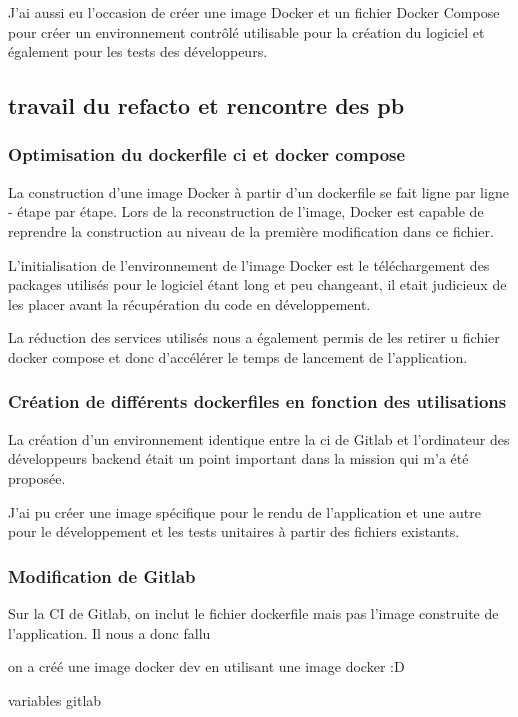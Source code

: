 J'ai aussi eu l'occasion de créer une image Docker et un fichier Docker Compose pour créer un environnement contrôlé utilisable pour la création du logiciel et également pour les tests des développeurs.

\subsection{travail du refacto et rencontre des pb}
\subsubsection{Optimisation du dockerfile ci et docker compose}
La construction d'une image Docker à partir d'un dockerfile se fait ligne par ligne - étape par étape.
Lors de la reconstruction de l'image, Docker est capable de reprendre la construction au niveau de la première modification dans ce fichier.

L'initialisation de l'environnement de l'image Docker est le téléchargement des packages utilisés pour le logiciel étant long et peu changeant, il etait judicieux de les placer avant la récupération du code en développement.

La réduction des services utilisés nous a également permis de les retirer u fichier docker compose et donc d'accélérer le temps de lancement de l'application.

\subsubsection{Création de différents dockerfiles en fonction des utilisations}
La création d'un environnement identique entre la ci de Gitlab et l'ordinateur des développeurs backend était un point important dans la mission qui m'a été proposée.

J'ai pu créer une image spécifique pour le rendu de l'application et une autre pour le développement et les tests unitaires à partir des fichiers existants.

\subsubsection{Modification de Gitlab}
Sur la CI de Gitlab, on inclut le fichier dockerfile mais pas l'image construite de l'application.
Il nous a donc fallu 

on a créé une image docker dev en utilisant une image docker :D

variables gitlab

